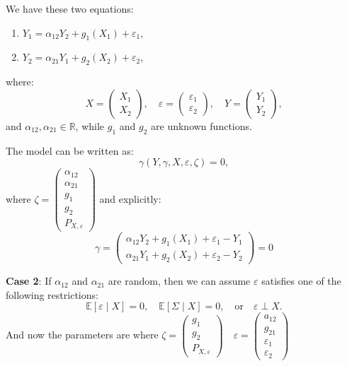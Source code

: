 \documentclass{article}
\begin{document}
    \begin{example}
        We have these two equations:
        \begin{enumerate}
            \item \( Y_1 = \alpha_{12} Y_2 + g_1(X_1) + \varepsilon_1 \),
            \item \( Y_2 = \alpha_{21} Y_1 + g_2(X_2) + \varepsilon_2 \),
            
        \end{enumerate}
        where:
            \[
            X = \begin{pmatrix} X_1 \\ X_2 \end{pmatrix}, \quad 
            \varepsilon = \begin{pmatrix} \varepsilon_1 \\ \varepsilon_2 \end{pmatrix}, \quad
            Y = \begin{pmatrix} Y_1 \\ Y_2 \end{pmatrix},
            \]
            and \(\alpha_{12}, \alpha_{21} \in \mathbb{R}\), while \(g_1\) and \(g_2\) are unknown functions.
            
            The model can be written as:
            \[
            \gamma(Y, \gamma, X, \varepsilon, \zeta) = 0,
            \]
            where \(\zeta = \begin{pmatrix} \alpha_{12} \\ \alpha_{21} \\ g_1 \\ g_2 \\P_{X, \varepsilon} \end{pmatrix}\) and explicitly:
            \[
            \gamma = 
            \begin{pmatrix} 
            \alpha_{12} Y_2 + g_1(X_1) + \varepsilon_1 - Y_1 \\
            \alpha_{21} Y_1 + g_2(X_2) + \varepsilon_2 - Y_2
            \end{pmatrix}=0
            \]

        \textbf{Case 2}: If \(\alpha_{12}\) and \(\alpha_{21}\) are random, then we can assume \(\varepsilon \) satisfies one of the following restrictions:
        \[
        \mathbb{E}[\varepsilon \mid X] = 0, \quad \mathbb{E}[\Sigma \mid X] = 0, \quad \text{or} \quad \varepsilon \perp X.
        \]
            And now the parameters are  where \(\zeta = \begin{pmatrix}  g_1 \\ g_2 \\P_{X, \varepsilon} \end{pmatrix} \quad \varepsilon=\begin{pmatrix}
            a_{12} \\ g_{21} \\  \varepsilon_1 \\\varepsilon_2
            \end{pmatrix}\)


\end{example}
\end{document}
